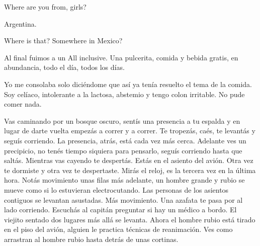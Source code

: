 \documentclass[12pt,twoside,openright,a5paper]{book}
\begin{document}
\vspace{0.5cm}

\hrulefill\hspace{0.2cm} \decofourleft\decofourright \hspace{0.2cm} \hrulefill
\vspace{0.5cm}

Where are you from, girls?

Argentina.

Where is that? Somewhere in Mexico?

\vspace{0.5cm}

\hrulefill\hspace{0.2cm} \decofourleft\decofourright \hspace{0.2cm} \hrulefill
\vspace{0.5cm}

Al final fuimos a un All inclusive. Una pulcerita, comida y bebida gratis,
en abundancia, todo el día, todos los días.

Yo me consolaba solo diciéndome que así ya tenía resuelto el tema de
la comida. Soy celíaco, intolerante a la lactosa, abstemio y tengo colon
irritable. No pude comer nada.


\vspace{0.5cm}

\hrulefill\hspace{0.2cm} \decofourleft\decofourright \hspace{0.2cm} \hrulefill
\vspace{0.5cm}

Vas caminando por un bosque oscuro, sentís una presencia a tu espalda
y en lugar de darte vuelta empezás a correr y a correr. Te tropezás,
caés, te levantás y seguís corriendo. La presencia, atrás, está cada vez
más cerca. Adelante ves un precipicio, no tenés tiempo siquiera
para pensarlo, seguís corriendo hasta que saltás. Mientras vas cayendo te
despertás. Estás en el asiento del avión. Otra vez te dormiste y otra vez
te despertaste. Mirás el reloj, es la tercera vez en la última hora. Notás
movimiento unas filas más adelante, un hombre grande y rubio se mueve  como
si lo estuvieran electrocutando. Las personas de los asientos contiguos
se levantan asustadas. Más movimiento. Una azafata te pasa por al lado
corriendo. Escuchás al capitán preguntar si hay un médico a bordo. El
viejito sentado dos lugares más allá se levanta. Ahora el hombre rubio
está tirado en el piso del avión, alguien le practica técnicas de
reanimación. Ves como arrastran al hombre rubio hasta detrás de
unas cortinas.
\end{document}
